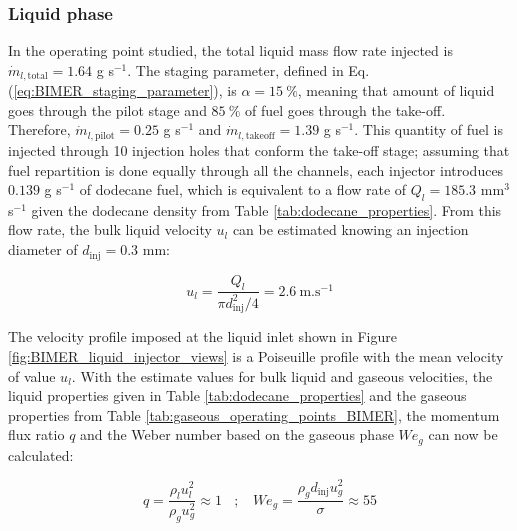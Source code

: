\subsubsection*{Liquid phase}

In the operating point studied, the total liquid mass flow rate injected is $\dot{m}_{l,\mathrm{total}} = 1.64$ g s$^{-1}$. The staging parameter, defined in Eq. (\ref{eq:BIMER_staging_parameter}), is $\alpha = 15 ~\%$, meaning that amount of liquid goes through the pilot stage and $85 ~\%$ of fuel goes through the take-off. Therefore, $\dot{m}_{l,\mathrm{pilot}} = 0.25$ g s$^{-1}$ and $\dot{m}_{l,\mathrm{takeoff}} = 1.39$ g s$^{-1}$. This quantity of fuel is injected through 10 injection holes that conform the take-off stage; assuming that fuel repartition is done equally through all the channels, each injector introduces $0.139$ g s$^{-1}$ of dodecane fuel, which is equivalent to a flow rate of $Q_l = 185.3$  mm$^3$ s$^{-1}$ given the dodecane density from Table \ref{tab:dodecane_properties}. From this flow rate, the bulk liquid velocity $u_l$ can be estimated knowing an injection diameter of $d_\mathrm{inj} = 0.3$ mm:

\begin{equation}
u_l = \frac{Q_l}{\pi d_\mathrm{inj}^2 / 4} = 2.6 ~ \mathrm{m}.\mathrm{s}^{-1}
\end{equation}


The velocity profile imposed at the liquid inlet shown in Figure \ref{fig:BIMER_liquid_injector_views} is a Poiseuille profile with the mean velocity of value $u_l$. With the estimate values for bulk liquid and gaseous velocities, the liquid properties given in Table \ref{tab:dodecane_properties} and the gaseous properties from Table \ref{tab:gaseous_operating_points_BIMER}, the momentum flux ratio $q$ and the Weber number based on the gaseous phase $We_g$ can now be calculated:


\begin{equation}
q =  \frac{\rho_l u_l^2}{\rho_g u_g^2} \approx 1 ~~~~ ; ~~~~  We_g =  \frac{\rho_g d_\mathrm{inj} u_g^2}{\sigma} \approx 55
\end{equation}

